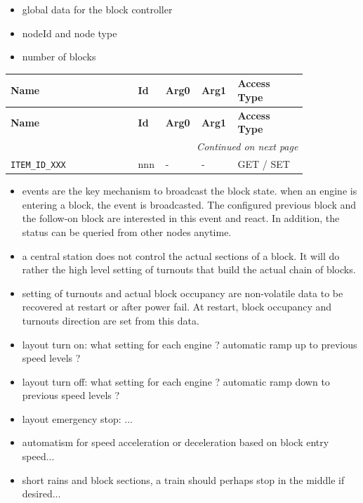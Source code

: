 
\begin{itemize}
\item global data for the block controller
\item nodeId and node type
\item number of blocks
\end{itemize}

\begin{longtable}{@{}|p{0.4\linewidth}|p{0.06\linewidth}|p{0.08\linewidth}|p{0.08\linewidth}|p{0.22\linewidth}|@{}}
    \toprule
    \textbf{Name} & \textbf{Id} & \textbf{Arg0} & \textbf{Arg1} & \textbf{Access Type} \\
    \midrule
    \midrule
    \endfirsthead
    \toprule
    \textbf{Name} & \textbf{Id} & \textbf{Arg0} & \textbf{Arg1} & \textbf{Access Type} \\
    \midrule
     \midrule
    \endhead
    \midrule
    \multicolumn{5}{r}{\textit{Continued on next page}} \\
    \midrule
    \endfoot
    \bottomrule
    \endlastfoot

    \texttt{ITEM\_ID\_XXX}       & nnn   & - & - & GET / SET \\
    \midrule
   
\end{longtable}



\begin{itemize}
\item events are the key mechanism to broadcast the block state. when an engine is entering a block, the event is broadcasted. The configured previous block and the follow-on block are interested in this event and react. In addition, the status can be queried from other nodes anytime.
\item a central station does not control the actual sections of a block. It will do rather the high level setting of turnouts that build the actual chain of blocks.
\item setting of turnouts and actual block occupancy are non-volatile data to be recovered at restart or after power fail. At restart, block occupancy and turnouts direction are set from this data.
\end{itemize}


\begin{itemize}
\item layout turn on: what setting for each engine ? automatic ramp up to previous speed levels ?
\item layout turn off: what setting for each engine ? automatic ramp down to previous speed levels ?
\item layout emergency stop: ...
\item automatism for speed acceleration or deceleration based on block entry speed...
\item short rains and block sections, a train should perhaps stop in the middle if desired...
\end{itemize}


